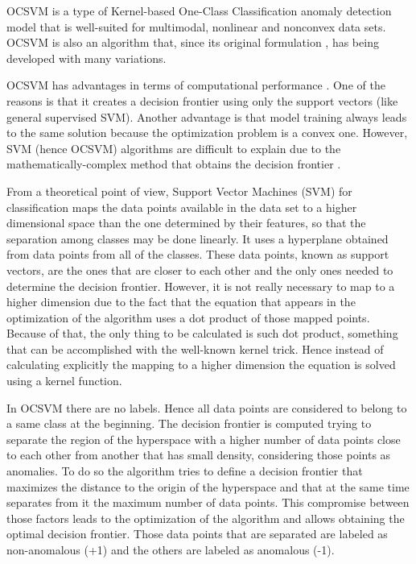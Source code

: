 OCSVM is a type of Kernel-based One-Class Classification anomaly detection model that is well-suited for multimodal, nonlinear and nonconvex data sets. OCSVM is also an algorithm that, since its original formulation \parencite{scholkopf2000support}, has being developed with many variations.

OCSVM has advantages in terms of computational performance \parencite{wang2004anomaly}. One of the reasons is that it creates a decision frontier using only the support vectors (like general supervised SVM). Another advantage is that model training always leads to the same solution because the optimization problem is a convex one. However, SVM (hence OCSVM) algorithms are difficult to explain due to the mathematically-complex method that obtains the decision frontier \parencite{arrieta2020explainable}.

From a theoretical point of view, Support Vector Machines (SVM) for classification maps the data points available in the data set to a higher dimensional space than the one determined by their features, so that the separation among classes may be done linearly. It uses a hyperplane obtained from data points from all of the classes. These data points, known as support vectors, are the ones that are closer to each other and the only ones needed to determine the decision frontier. However, it is not really necessary to map to a higher dimension due to the fact that the equation that appears in the optimization of the algorithm uses a dot product of those mapped points. Because of that, the only thing to be calculated is such dot product, something that can be accomplished with the well-known kernel trick. Hence instead of calculating explicitly the mapping to a higher dimension the equation is solved using a kernel function. 

In OCSVM there are no labels. Hence all data points are considered to belong to a same class at the beginning. The decision frontier is computed trying to separate the region of the hyperspace with a higher number of data points close to each other from another that has small density, considering those points as anomalies. To do so the algorithm tries to define a decision frontier that maximizes the distance to the origin of the hyperspace and that at the same time separates from it the maximum number of data points. This compromise between those factors leads to the optimization of the algorithm and allows obtaining the optimal decision frontier. Those data points that are separated are labeled as non-anomalous (+1) and the others are labeled as anomalous (-1).

